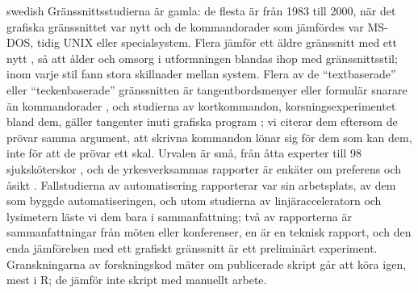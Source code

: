 \begin{onlyin}{swedish}
Gränssnittsstudierna är gamla: de flesta är från 1983 till 2000, när
det grafiska gränssnittet var nytt och de kommandorader som jämfördes
var MS-DOS, tidig UNIX eller specialsystem.  Flera jämför ett äldre
gränssnitt med ett nytt \autocite{Staggers2000Comparing}, så att ålder
och omsorg i utformningen blandas ihop med gränssnittsstil; inom varje
stil fann \textcite{Whiteside1985User} stora skillnader mellan system.
Flera av de \enquote{textbaserade} eller \enquote{teckenbaserade}
gränssnitten är tangentbordsmenyer eller formulär snarare än
kommandorader
\autocite{Rauterberg1992Empirical,dYdewalle1995Graphical,%
  Chen2007Comparing},
och studierna av kortkommandon, korsningsexperimentet bland dem, gäller
tangenter inuti grafiska program
\autocite{Remington2016With,Lane2005Hidden,Tak2013Satisficing}; vi
citerar dem eftersom de prövar samma argument, att skrivna kommandon
lönar sig för dem som kan dem, inte för att de prövar ett skal.  Urvalen
är små, från åtta experter \autocite{Chen2007Comparing} till 98
sjuksköterskor \autocite{Staggers2000Comparing}, och de yrkesverksammas
rapporter är enkäter om preferens och åsikt
\autocite{Takayama2006Trust,Voronkov2019System,Murillo2014Empowering}.
Fallstudierna av automatisering rapporterar var sin arbetsplats, av dem
som byggde automatiseringen, och utom studierna av linjäracceleratorn och
lysimetern läste vi dem bara i sammanfattning; två av rapporterna är
sammanfattningar från möten eller konferenser, en är en teknisk rapport,
och den enda jämförelsen med ett grafiskt gränssnitt är ett preliminärt
experiment.  Granskningarna av forskningskod mäter om publicerade skript går
att köra
igen, mest i R; de jämför inte skript med manuellt arbete.


\end{onlyin}
